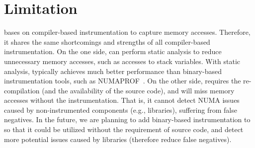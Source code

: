 \section{Limitation}
\label{sec:discussion}
\NP{} bases on compiler-based instrumentation to capture memory accesses. Therefore, it shares the same shortcomings and strengths of all compiler-based instrumentation. On the one side, \NP{} can perform static analysis to reduce unnecessary memory accesses, such as accesses to stack variables. With static analysis, \NP{} typically achieves much better performance than binary-based instrumentation tools, such as NUMAPROF~\cite{valat:2018:numaprof}. On the other side, \NP{} requires the re-compilation (and the availability of the source code), and will miss memory accesses without the instrumentation. That is, it cannot detect NUMA issues caused by non-instrumented components (e.g., libraries), suffering from false negatives. 
In the future, we are planning to add binary-based instrumentation to \NP{} so that it could be utilized without the requirement of source code, and detect more potential issues caused by libraries (therefore reduce false negatives). 

